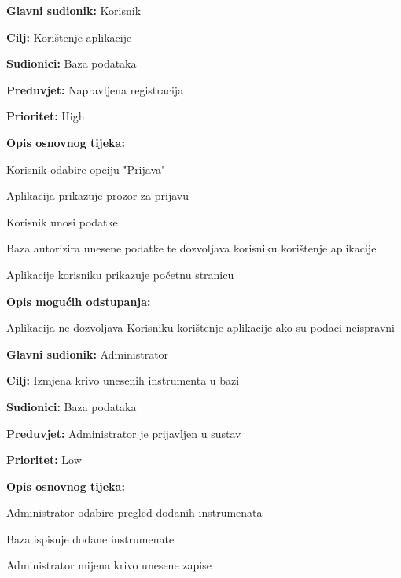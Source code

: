 \noindent {}
	\begin{packed_item}
	
		\item \textbf{Glavni sudionik: } Korisnik
		\item  \textbf{Cilj:} Korištenje aplikacije
		\item  \textbf{Sudionici:} Baza podataka
		\item  \textbf{Preduvjet:} Napravljena registracija
		\item  \textbf{Prioritet:} High
		\item  \textbf{Opis osnovnog tijeka:}
		
		\item[] \begin{packed_enum}
			
			\item Korisnik odabire opciju "Prijava"
			\item Aplikacija prikazuje prozor za prijavu
			\item Korisnik unosi podatke
			\item Baza autorizira unesene podatke te dozvoljava korisniku korištenje aplikacije
			\item Aplikacije korisniku prikazuje početnu stranicu
		\end{packed_enum}
	
			\item  \textbf{Opis mogućih odstupanja:}
			\item[] \begin{packed_enum}
												
				\item[2.a] Aplikacija ne dozvoljava Korisniku korištenje aplikacije ako su podaci neispravni
				
			\end{packed_enum}
	\end{packed_item}


\noindent {}
	\begin{packed_item}

		\item \textbf{Glavni sudionik:} Administrator
		\item \textbf{Cilj:} Izmjena krivo unesenih instrumenta u bazi
		\item \textbf{Sudionici:} Baza podataka
		\item \textbf{Preduvjet:} Administrator je prijavljen u sustav
		\item \textbf{Prioritet:} Low
		\item \textbf{Opis osnovnog tijeka:}
		
		\item[] \begin{packed_enum}

			\item Administrator odabire pregled dodanih instrumenata
			\item Baza ispisuje dodane instrumenate
			\item Administrator mijena krivo unesene zapise 
		\end{packed_enum}
	\end{packed_item}
			
